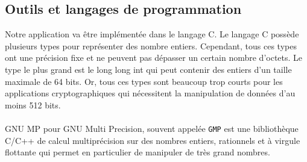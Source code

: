 	\subsection{Outils et langages de programmation}
	Notre application va être implémentée dans le langage {\ttfamily C}. Le langage {\ttfamily C} possède plusieurs types pour représenter des nombre entiers. Cependant, tous ces types ont une précision fixe et ne peuvent pas dépasser un certain nombre d'octets. Le type le plus grand est le {\ttfamily long long int} qui peut contenir des entiers d'un taille maximale de 64 bits. Or, tous ces types sont beaucoup trop courts pour les applications cryptographiques qui nécessitent la manipulation de données d'au moins 512 bits.
	\paragraph{}{\ttfamily GNU MP} pour {\ttfamily GNU Multi Precision}, souvent appelée \lstinline!GMP! est une bibliothèque {\ttfamily C}/{\ttfamily C++} de calcul multiprécision sur des nombres entiers, rationnels et à virgule flottante qui permet en particulier de manipuler de très grand nombres.
	